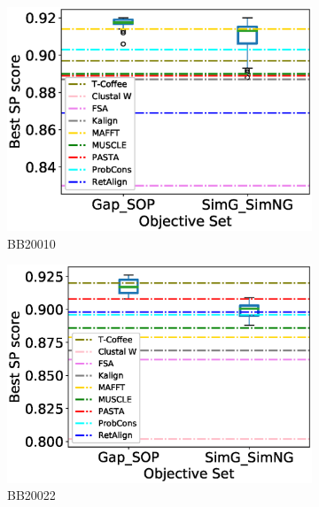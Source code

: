 \begin{figure}[!htbp]
\begin{adjustwidth}{-1.5cm}{-1cm}
\begin{subfigure}{0.22\textwidth}
			\includegraphics[width=\columnwidth]{Figure/summary/precomputedInit/Balibase/BB20010_objset_pairs_rank_2}
			\caption{BB20010}
		\end{subfigure}
		\begin{subfigure}{0.22\textwidth}
			\includegraphics[width=\columnwidth]{Figure/summary/precomputedInit/Balibase/BB20022_objset_pairs_rank_2}
			\caption{BB20022}
		\end{subfigure}
		\begin{subfigure}{0.22\textwidth}

\end{subfigure}
\end{adjustwidth}
\end{figure}
